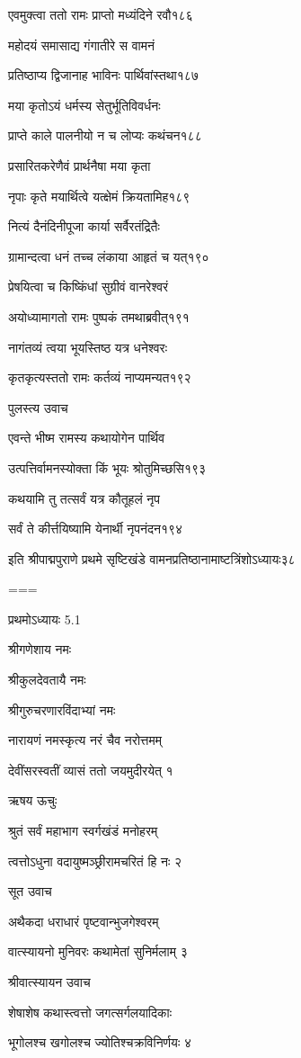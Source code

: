 एवमुक्त्वा ततो रामः प्राप्तो मध्यंदिने रवौ१८६

महोदयं समासाद्य गंगातीरे स वामनं

प्रतिष्ठाप्य द्विजानाह भाविनः पार्थिवांस्तथा१८७

मया कृतोऽयं धर्मस्य सेतुर्भूतिविवर्धनः

प्राप्ते काले पालनीयो न च लोप्यः कथंचन१८८

प्रसारितकरेणैवं प्रार्थनैषा मया कृता

नृपाः कृते मयार्थित्वे यत्क्षेमं क्रियतामिह१८९

नित्यं दैनंदिनीपूजा कार्या सर्वैरतंद्रितैः

ग्रामान्दत्वा धनं तच्च लंकाया आहृतं च यत्१९०

प्रेषयित्वा च किष्किंधां सुग्रीवं वानरेश्वरं

अयोध्यामागतो रामः पुष्पकं तमथाब्रवीत्१९१

नागंतव्यं त्वया भूयस्तिष्ठ यत्र धनेश्वरः

कृतकृत्यस्ततो रामः कर्तव्यं नाप्यमन्यत१९२

पुलस्त्य उवाच

एवन्ते भीष्म रामस्य कथायोगेन पार्थिव

उत्पत्तिर्वामनस्योक्ता किं भूयः श्रोतुमिच्छसि१९३

कथयामि तु तत्सर्वं यत्र कौतूहलं नृप

सर्वं ते कीर्त्तयिष्यामि येनार्थी नृपनंदन१९४

इति श्रीपाद्मपुराणे प्रथमे सृष्टिखंडे वामनप्रतिष्ठानामाष्टत्रिंशोऽध्यायः३८


===


प्रथमोऽध्यायः 5.1

श्रीगणेशाय नमः

श्रीकुलदेवतायै नमः

श्रीगुरुचरणारविंदाभ्यां नमः

नारायणं नमस्कृत्य नरं चैव नरोत्तमम्

देवींसरस्वतीं व्यासं ततो जयमुदीरयेत् १

ऋषय ऊचुः

श्रुतं सर्वं महाभाग स्वर्गखंडं मनोहरम्

त्वत्तोऽधुना वदायुष्मञ्छ्रीरामचरितं हि नः २

सूत उवाच

अथैकदा धराधारं पृष्टवान्भुजगेश्वरम्

वात्स्यायनो मुनिवरः कथामेतां सुनिर्मलाम् ३

श्रीवात्स्यायन उवाच

शेषाशेष कथास्त्वत्तो जगत्सर्गलयादिकाः

भूगोलश्च खगोलश्च ज्योतिश्चक्रविनिर्णयः ४

